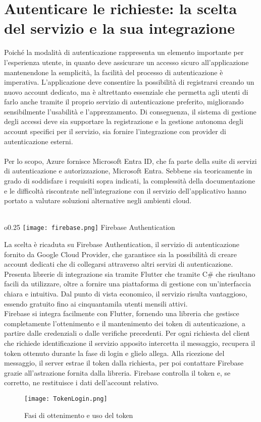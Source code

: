 
\section{Autenticare le richieste: la scelta del servizio e la sua integrazione}


Poiché la modalità di autenticazione rappresenta
un elemento importante per l'esperienza utente,
in quanto deve assicurare un accesso sicuro all'applicazione mantenendone la semplicità,
la facilità del processo di autenticazione è imperativa.
L'applicazione deve consentire la possibilità di registrarsi
creando un nuovo account dedicato,
ma è altrettanto essenziale che permetta agli utenti di farlo anche
tramite il proprio servizio di autenticazione preferito,
migliorando sensibilmente l'usabilità e l'apprezzamento.
Di conseguenza, il sistema di gestione degli accessi deve 
sia supportare la registrazione e la gestione autonoma 
degli account specifici per il servizio,
sia fornire l'integrazione con provider di autenticazione esterni.\\
\\
Per lo scopo, Azure fornisce Microsoft Entra ID,
che fa parte della suite di servizi di autenticazione e autorizzazione, Microsoft Entra.
Sebbene sia teoricamente in grado di soddisfare i requisiti sopra indicati,
la complessità della documentazione e le difficoltà
riscontrate nell'integrazione con il servizio dell'applicativo
hanno portato a valutare soluzioni alternative negli ambienti cloud.\\
\\
\begin{wrapfigure}{o}{0.25\textwidth}
    \centering
    \texttt{[image: firebase.png]}
    Firebase Authentication
\end{wrapfigure}
La scelta è ricaduta su Firebase Authentication,
il servizio di autenticazione fornito da Google Cloud Provider,
che garantisce sia la possibilità di creare account dedicati
che di collegarsi attraverso altri servizi di autenticazione.
Presenta librerie di integrazione sia tramite Flutter
che tramite C\# che risultano facili da utilizzare,
oltre a fornire una piattaforma di gestione con un'interfaccia chiara e intuitiva.
Dal punto di vista economico, il servizio risulta vantaggioso,
essendo gratuito fino ai cinquantamila utenti mensili attivi.\\
\clearpage
Firebase si integra facilmente con Flutter,
fornendo una libreria che gestisce completamente 
l'ottenimento e il mantenimento dei token di autenticazione,
a partire dalle credenziali o dalle verifiche precedenti.
Per ogni richiesta del client che richiede identificazione
il servizio apposito intercetta il messaggio,
recupera il token ottenuto durante la fase di login e glielo allega.
Alla ricezione del messaggio, il server estrae il token dalla richiesta,
per poi contattare Firebase grazie all'astrazione fornita dalla libreria.
Firebase controlla il token e, se corretto,
ne restituisce i dati dell'account relativo.\\
\begin{figure}[htpb]
    \centering
    \texttt{[image: TokenLogin.png]}
    \caption{Fasi di ottenimento e uso del token}
\end{figure}


